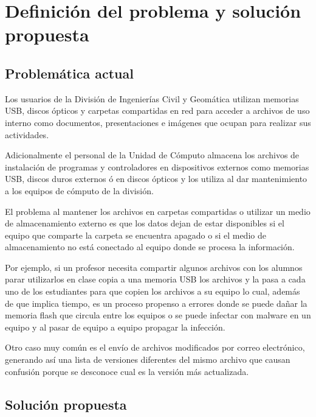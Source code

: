   \label{chap:cap2}
  \chapter {Definici\'{o}n del problema y soluci\'{o}n propuesta}

    \section {Problem\'{a}tica actual}

Los usuarios de la Divisi\'{o}n de Ingenier\'{i}as Civil y Geom\'{a}tica utilizan memorias \textsc{USB}, discos \'{o}pticos y carpetas compartidas en red para acceder a archivos de uso interno como documentos, presentaciones e im\'{a}genes que ocupan para realizar sus actividades.

Adicionalmente el personal de la Unidad de C\'{o}mputo almacena los archivos de instalaci\'{o}n de programas y controladores en dispositivos externos como memorias \textsc{USB}, discos duros externos \'{o} en discos \'{o}pticos y los utiliza al dar mantenimiento a los equipos de c\'{o}mputo de la divisi\'{o}n.

El problema al mantener los archivos en carpetas compartidas o utilizar un medio de almacenamiento externo es que los datos dejan de estar disponibles si el equipo que comparte la carpeta se encuentra apagado o si el medio de almacenamiento no est\'{a} conectado al equipo donde se procesa la informaci\'{o}n.

Por ejemplo, si un profesor necesita compartir algunos archivos con los alumnos parar utilizarlos en clase copia a una memoria \textsc{USB} los archivos y la pasa a cada uno de los estudiantes para que copien los archivos a su equipo lo cual, adem\'{a}s de que implica tiempo, es un proceso propenso a errores donde se puede da\~{n}ar la memoria flash que circula entre los equipos o se puede infectar con malware en un equipo y al pasar de equipo a equipo propagar la infecci\'{o}n.

Otro caso muy com\'{u}n es el env\'{i}o de archivos modificados por correo electr\'{o}nico, generando as\'{i} una lista de versiones diferentes del mismo archivo que causan confusi\'{o}n porque se desconoce cual es la versi\'{o}n m\'{a}s actualizada.

    \section {Soluci\'{o}n propuesta}

